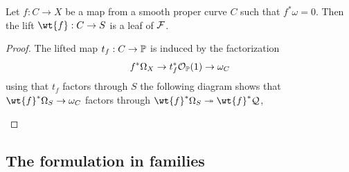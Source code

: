 \documentclass[main.tex]{subfiles}
\begin{document}
\begin{lemma} \label{lemma:holonomic_leaf}
Let $f : C \to X$ be a map from a smooth proper curve $C$ such that $f^* \omega = 0$. Then the lift $\wt{f} : C \to S$ is a leaf of $\F$.    
\end{lemma}

\begin{proof}
The lifted map $t_f : C \to \P$ is induced by the factorization 
\[ f^* \Omega_X \to t_f^* \cO_{\P}(1) \to \omega_C \]
using that $t_f$ factors through $S$ the following diagram shows that $\wt{f}^* \Omega_{S} \to \omega_C$ factors through $\wt{f}^* \Omega_{S} \onto \wt{f}^* \cQ$,
\begin{center}
\end{center}
\end{proof}

\subsection{The formulation in families} \label{section:formulation_in_families}
\end{document}
